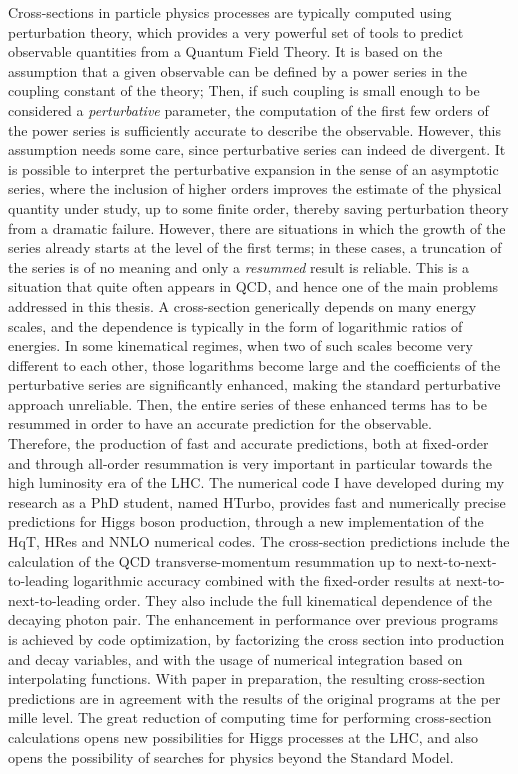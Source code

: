 \documentclass[12pt]{article}
\begin{document}
Cross-sections in particle physics processes are typically computed using perturbation theory, which provides a very powerful set of tools to predict observable quantities from a Quantum Field Theory. It is based on the assumption that a given observable can be defined by a power series in the coupling constant of the theory; Then, if such coupling is small enough to be considered a \textit{perturbative} parameter, the computation of the first few orders of the power series is sufficiently accurate to describe the observable. However, this assumption needs some care, since perturbative series can indeed de divergent. It is possible to interpret the perturbative expansion in the sense of an asymptotic series, where the inclusion of higher orders improves the estimate of the physical quantity under study, up to some finite order, thereby saving perturbation theory from a dramatic failure. However, there are situations in which the growth of the series already starts at the level of the first terms; in these cases, a truncation of the series is of no meaning and only a \textit{resummed} result is reliable. This is a situation that quite often appears in QCD, and hence one of the main problems addressed in this thesis. A cross-section generically depends on many energy scales, and the dependence is typically in the form of logarithmic ratios of energies. In some kinematical regimes, when two of such scales become very different to each other, those logarithms become large and the coefficients of the perturbative series are significantly enhanced, making the standard perturbative approach unreliable. Then, the entire series of these enhanced terms has to be resummed in order to have an accurate prediction for the observable.\\

Therefore, the production of fast and accurate predictions, both at fixed-order and through all-order resummation is very important in particular towards the high luminosity era of the LHC. The numerical code I have developed during my research as a PhD student, named HTurbo, provides fast and numerically precise predictions for Higgs boson production, through a new implementation of the HqT, HRes and NNLO numerical codes. The cross-section predictions include the calculation of the QCD transverse-momentum resummation up to next-to-next-to-leading logarithmic accuracy combined with the fixed-order results at next-to-next-to-leading order. They also include the full kinematical dependence of the decaying photon pair. The enhancement in performance over previous programs is achieved by code optimization, by factorizing the cross section into production and decay variables, and with the usage of numerical integration based on interpolating functions. With paper in preparation, the resulting cross-section predictions are in agreement with the results of the original programs at the per mille level. The great reduction of computing time for performing cross-section calculations opens new possibilities for Higgs processes at the LHC, and also opens the possibility of searches for physics beyond the Standard Model.
\end{document}
